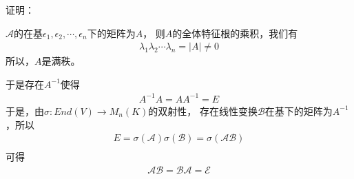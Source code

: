 \documentclass{article}
\begin{document}
证明：

$\mathscr{A}$的在基$\epsilon_1, \epsilon_2, \cdots, \epsilon_n$下的矩阵为$A$，
则$A$的全体特征根的乘积，我们有
\begin{align*}
  \lambda_1 \lambda_2 \cdots \lambda_n = |A| \neq 0
\end{align*}
所以，$A$是满秩。

于是存在$A^{-1}$使得
\begin{align*}
  A^{-1} A = A A^{-1} = E
\end{align*}
于是，由$\sigma: End(V) \to M_n(K)$的双射性，
存在线性变换$\mathscr{B}$在基下的矩阵为$A^{-1}$，所以
\begin{align*}
  E = \sigma(\mathscr{A}) \sigma(\mathscr{B}) = \sigma(\mathscr{A}\mathscr{B})\\
\end{align*}
可得
\begin{align*}
  \mathscr{A} \mathscr{B} = \mathscr{B} \mathscr{A} = \mathscr{E}
\end{align*}
\end{document}
